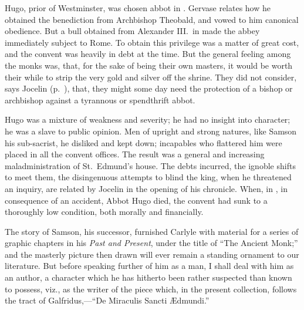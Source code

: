 \documentclass[10pt]{book}
\begin{document}
{Hugo, prior of Westminster, was chosen abbot in . Gervase relates how he obtained the benediction from Archbishop Theobald, and vowed to him canonical obedience. But a bull obtained from Alexander III.\ in  made the abbey immediately subject to Rome. To obtain this privilege was a matter of great cost, and the convent was heavily in debt at the time. But the general feeling among the monks was, that, for the sake of being their own masters, it would be worth their while to strip the very gold and silver off the shrine. They did not consider, says Jocelin (p.\ ), that, they might some day need the protection of a bishop or archbishop against a tyrannous or spendthrift abbot.

Hugo was a mixture of weakness and severity; he had no insight into character; he was a slave to public opinion. Men of upright and strong natures, like Samson his sub-sacrist, he disliked and kept down; incapables who flattered him were placed in all the convent offices. The result was a general and increasing maladministration of St.\ Edmund's house. The debts incurred, the ignoble shifts to meet them, the disingenuous attempts to blind the king, when he threatened an inquiry, are related by Jocelin in the opening of his chronicle. When, in , in consequence of an accident, Abbot Hugo died, the convent had sunk to a thoroughly low condition, both morally and financially.

The story of Samson, his successor, furnished Carlyle with material for a series of graphic chapters in his \emph{Past and Present}, under the title of ``The Ancient Monk;'' and the masterly picture then drawn will ever remain a standing ornament to our literature. But before speaking further of him as a man, I shall deal with him as an author, a character which he has hitherto been rather suspected than known to possess, viz., as the writer of the piece which, in the present collection, follows the tract of Galfridus,---``De Miraculis Sancti \AE{}dmundi.''

}
\end{document}
